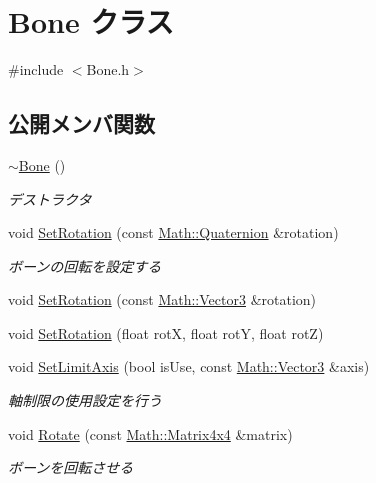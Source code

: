 \hypertarget{class_bone}{}\section{Bone クラス}
\label{class_bone}


{\ttfamily \#include $<$Bone.\+h$>$}

\subsection*{公開メンバ関数}
\begin{DoxyCompactItemize}
\item 
\mbox{\hyperlink{class_bone_a8a85b84508716d1214f7fb69982d917c}{$\sim$\+Bone}} ()
\begin{DoxyCompactList}\small\item\em デストラクタ \end{DoxyCompactList}\item 
void \mbox{\hyperlink{class_bone_a4d328e19a6a90cb28bfe016a16eeac94}{Set\+Rotation}} (const \mbox{\hyperlink{struct_math_1_1_quaternion}{Math\+::\+Quaternion}} \&rotation)
\begin{DoxyCompactList}\small\item\em ボーンの回転を設定する \end{DoxyCompactList}\item 
void \mbox{\hyperlink{class_bone_a949005e4fab78a4072736614d6ec7886}{Set\+Rotation}} (const \mbox{\hyperlink{struct_math_1_1_vector3}{Math\+::\+Vector3}} \&rotation)
\item 
void \mbox{\hyperlink{class_bone_a8fd49736393fd37e5e029523e006c3a3}{Set\+Rotation}} (float rotX, float rotY, float rotZ)
\item 
void \mbox{\hyperlink{class_bone_a13f0dd0077175c8d8e446b8aaadcc85e}{Set\+Limit\+Axis}} (bool is\+Use, const \mbox{\hyperlink{struct_math_1_1_vector3}{Math\+::\+Vector3}} \&axis)
\begin{DoxyCompactList}\small\item\em 軸制限の使用設定を行う \end{DoxyCompactList}\item 
void \mbox{\hyperlink{class_bone_ab75e73a4a7ea9901ee53a686953ade2d}{Rotate}} (const \mbox{\hyperlink{struct_math_1_1_matrix4x4}{Math\+::\+Matrix4x4}} \&matrix)
\begin{DoxyCompactList}\small\item\em ボーンを回転させる \end{DoxyCompactList}\item 

\end{DoxyCompactItemize}
